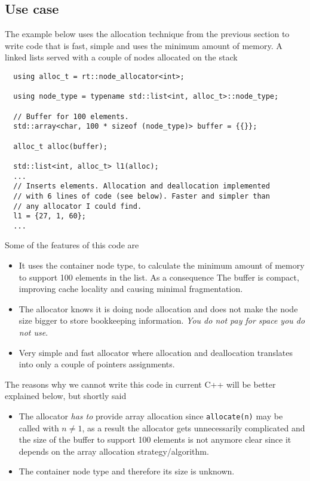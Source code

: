 \documentclass[11pt]{article}
\begin{document}
\subsection{Use case}
The example below uses the allocation technique from the previous section to
write code that is fast, simple and uses the minimum amount of memory. A linked
lists served with a couple of nodes allocated on the stack
\medskip
\begin{lstlisting}
  using alloc_t = rt::node_allocator<int>;

  using node_type = typename std::list<int, alloc_t>::node_type;

  // Buffer for 100 elements.
  std::array<char, 100 * sizeof (node_type)> buffer = {{}};

  alloc_t alloc(buffer);

  std::list<int, alloc_t> l1(alloc);
  ...
  // Inserts elements. Allocation and deallocation implemented
  // with 6 lines of code (see below). Faster and simpler than
  // any allocator I could find.
  l1 = {27, 1, 60};
  ...
\end{lstlisting}

Some of the features of this code are
\begin{itemize}

\item It uses the container node type, to calculate the minimum amount of
memory to support 100 elements in the list. As a consequence The buffer is
compact, improving cache locality and causing minimal fragmentation.

\item The allocator knows it is doing node allocation and does not make the
node size bigger to store bookkeeping information. {\it You do not pay for
space you do not use}.

\item Very simple and fast allocator where allocation and deallocation
translates into only a couple of pointers assignments.
\end{itemize}

The reasons why we cannot write this code in current C++ will
be better explained below, but shortly said

\begin{itemize}

\item The allocator {\it has to} provide array allocation since 
\texttt{allocate(n)} may be called with $n \ne 1$, as a result
the allocator gets unnecessarily complicated and the size of the
buffer to support 100 elements is not anymore clear since it depends
on the array allocation strategy/algorithm.

\item The container node type and therefore its size is unknown.

\end{itemize}
\end{document}
